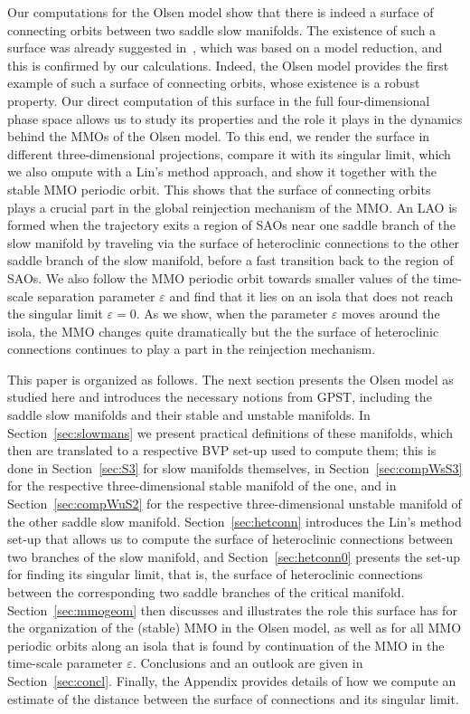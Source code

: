 \documentclass{ws-ijbc}
\begin{document}
Our computations for the Olsen model show that there is indeed a surface of connecting orbits between two saddle slow manifolds. The existence of such a surface was already suggested in~\cite{QSSA}, which was based on a model reduction, and this is confirmed by our calculations. Indeed, the Olsen model provides the first example of such a surface of connecting orbits, whose existence is a robust property. Our direct computation of this surface in the full four-dimensional phase space allows us to study its properties and the role it plays in the dynamics behind the MMOs of the Olsen model. To this end, we render the surface in different three-dimensional projections, compare it with its singular limit, which we also ompute with a Lin's method approach, and show it together with the stable MMO periodic orbit. This shows that the surface of connecting orbits plays a crucial part in the global reinjection mechanism of the MMO. An LAO is formed when the trajectory exits a region of SAOs near one saddle branch of the slow manifold by traveling via the surface of heteroclinic connections to the other saddle branch of the slow manifold, before a fast transition back to the region of SAOs. We also follow the MMO periodic orbit towards smaller values of the time-scale separation parameter $\varepsilon$ and find that it lies on an isola that does not reach the singular limit $\varepsilon = 0$. As we show, when the parameter $\varepsilon$ moves around the isola, the MMO changes quite dramatically but the the surface of heteroclinic connections continues to play a part in the reinjection mechanism.  

This paper is organized as follows. The next section presents the Olsen model as studied here and introduces the necessary notions from GPST, including the saddle slow manifolds and their stable and unstable manifolds.  In Section~\ref{sec:slowmans} we present practical definitions of these manifolds, which then are translated to a respective BVP set-up used to compute them; this is done in Section~\ref{sec:S3} for slow manifolds themselves, in Section~\ref{sec:compWsS3}  for the respective three-dimensional stable manifold of the one, and in Section~\ref{sec:compWuS2} for the respective three-dimensional unstable manifold of the other saddle slow manifold. Section~\ref{sec:hetconn} introduces the Lin's method set-up that allows us to compute the surface of heteroclinic connections between two branches of the slow manifold, and Section~\ref{sec:hetconn0} presents the set-up for finding its singular limit, that is, the surface of heteroclinic connections between the corresponding two saddle branches of the critical manifold. Section~\ref{sec:mmogeom} then discusses and illustrates the role this surface has for the organization of the (stable) MMO in the Olsen model, as well as for all MMO periodic orbits along an isola that is found by continuation of the MMO in the time-scale parameter $\varepsilon$. Conclusions and an outlook are given in Section~\ref{sec:concl}. Finally, the Appendix provides details of how we compute an estimate of the distance between the surface of connections and its singular limit.
\end{document}
